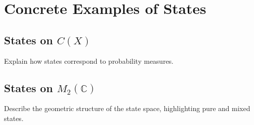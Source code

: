 \section{Concrete Examples of States}
\subsection{States on \( C(X) \)}
Explain how states correspond to probability measures.

\subsection{States on \( M_2(\mathbb{C}) \)}
Describe the geometric structure of the state space, highlighting pure and mixed states.